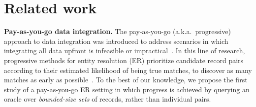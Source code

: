 \documentclass[sigconf, nonacm]{acmart}
\newcommand{\window}{b}
\newcommand{\blue}[1]{\textcolor{blue}{#1}}
\begin{document}
{









\section{Related work}\label{sec:related_work}

\noindent\textbf{Pay-as-you-go data integration.}
The pay-as-you-go (a.k.a.\ progressive) approach to data integration was introduced to address scenarios in which integrating all data upfront is infeasible or impractical~\cite{DBLP:conf/cidr/MadhavanCDHJKY07}.
In this line of research, progressive methods for entity resolution (ER) prioritize candidate record pairs according to their estimated likelihood of being true matches, to discover as many matches as early as possible~\cite{DBLP:journals/tkde/WhangMG13, papadakis_exploration, DBLP:journals/tkde/SimoniniPPB19, DBLP:journals/tkde/PapenbrockHN15, DBLP:journals/pvldb/SimoniniZBN22}.
To the best of our knowledge, we propose the first study of a pay-as-you-go ER setting in which progress is achieved by querying an oracle over \emph{bounded-size sets} of records, rather than individual pairs.

}
\end{document}
